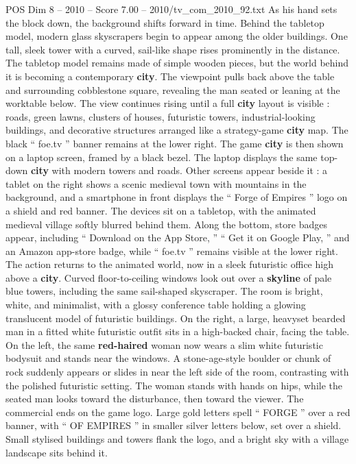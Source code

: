 \begin{textsample}{POS Dim 8 – 2010 – Score 7.00 – 2010/tv\_com\_2010\_92.txt}
As his hand sets the block down, the background shifts forward in time.
Behind the tabletop model, modern glass skyscrapers begin to appear among the older buildings.
One tall, sleek tower with a curved, sail-like shape rises prominently in the distance.
The tabletop model remains made of simple wooden pieces, but the world behind it is becoming a contemporary \textbf{city}.
The viewpoint pulls back above the table and surrounding cobblestone square, revealing the man seated or leaning at the worktable below.
The view continues rising until a full \textbf{city} layout is visible : roads, green lawns, clusters of houses, futuristic towers, industrial-looking buildings, and decorative structures arranged like a strategy-game \textbf{city} map.
The black “ foe.tv ” banner remains at the lower right.
The game \textbf{city} is then shown on a laptop screen, framed by a black bezel.
The laptop displays the same top-down \textbf{city} with modern towers and roads.
Other screens appear beside it : a tablet on the right shows a scenic medieval town with mountains in the background, and a smartphone in front displays the “ Forge of Empires ” logo on a shield and red banner.
The devices sit on a tabletop, with the animated medieval village softly blurred behind them.
Along the bottom, store badges appear, including “ Download on the App Store, ” “ Get it on Google Play, ” and an Amazon app-store badge, while “ foe.tv ” remains visible at the lower right.
The action returns to the animated world, now in a sleek futuristic office high above a \textbf{city}.
Curved floor-to-ceiling windows look out over a \textbf{skyline} of pale blue towers, including the same sail-shaped skyscraper.
The room is bright, white, and minimalist, with a glossy conference table holding a glowing translucent model of futuristic buildings.
On the right, a large, heavyset bearded man in a fitted white futuristic outfit sits in a high-backed chair, facing the table.
On the left, the same \textbf{red-haired} woman now wears a slim white futuristic bodysuit and stands near the windows.
A stone-age-style boulder or chunk of rock suddenly appears or slides in near the left side of the room, contrasting with the polished futuristic setting.
The woman stands with hands on hips, while the seated man looks toward the disturbance, then toward the viewer.
The commercial ends on the game logo.
Large gold letters spell “ FORGE ” over a red banner, with “ OF EMPIRES ” in smaller silver letters below, set over a shield.
Small stylised buildings and towers flank the logo, and a bright sky with a village landscape sits behind it.

\end{textsample}
